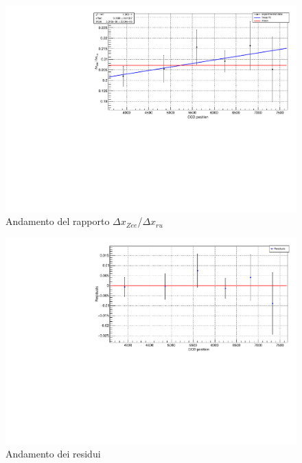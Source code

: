 \documentclass{article}
\begin{document}
	\begin{center}
		\begin{figure}[H]
			\centering
			\includegraphics[scale=0.38, angle=0]{campomin/fit.pdf}
			\setlength{\belowcaptionskip}{-20pt}
			\caption{Andamento del rapporto $\Delta x_{Zee}$/$\Delta x_{ru}$}
			\label{fig:fit_rapporto_min}
		\end{figure}
	\end{center}

	\begin{center}
		\begin{figure}[H]
			\centering
			\includegraphics[scale=0.38, angle=0]{campomin/residuals.pdf}
			\setlength{\belowcaptionskip}{-20pt}
			\caption{Andamento dei residui}
			\label{fig:fit_rapporto_min_res}
		\end{figure}
	\end{center}
\end{document}
